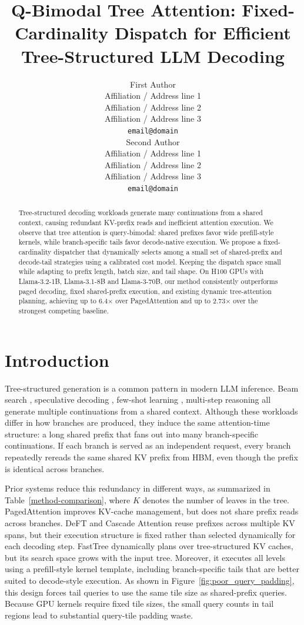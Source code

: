 \documentclass[11pt]{article}
\title{Q-Bimodal Tree Attention: Fixed-Cardinality Dispatch for Efficient Tree-Structured LLM Decoding}
\author{First Author \\
  Affiliation / Address line 1 \\
  Affiliation / Address line 2 \\
  Affiliation / Address line 3 \\
  \texttt{email@domain} \\\And
  Second Author \\
  Affiliation / Address line 1 \\
  Affiliation / Address line 2 \\
  Affiliation / Address line 3 \\
  \texttt{email@domain} \\}
\begin{document}
\maketitle
\begin{abstract}
Tree-structured decoding workloads generate many continuations from a shared context, causing redundant KV-prefix reads and inefficient attention execution. We observe that tree attention is query-bimodal: shared prefixes favor wide prefill-style kernels, while branch-specific tails favor decode-native execution. We propose a fixed-cardinality dispatcher that dynamically selects among a small set of shared-prefix and decode-tail strategies using a calibrated cost model. Keeping the dispatch space small while adapting to prefix length, batch size, and tail shape. On H100 GPUs with Llama-3.2-1B, Llama-3.1-8B and Llama-3-70B, our method consistently outperforms paged decoding, fixed shared-prefix execution, and existing dynamic tree-attention planning, achieving up to 6.4× over PagedAttention and up to 2.73× over the strongest competing baseline.
\end{abstract}

\section{Introduction}

Tree-structured generation is a common pattern in modern LLM inference.
Beam search \cite{vijayakumar2018diversebeamsearchdecoding}, speculative decoding \cite{10.1145/3620666.3651335, li2025eagle3}, few-shot
learning \cite{10.5555/3495724.3495883}, multi-step reasoning \cite{yao2023treethoughtsdeliberateproblem, hao2023reasoninglanguagemodelplanning} all generate multiple continuations from a
shared context. Although these workloads differ in how branches are produced,
they induce the same attention-time structure: a long shared prefix that fans out
into many branch-specific continuations. If each branch is served as an
independent request, every branch repeatedly rereads the same shared KV prefix
from HBM, even though the prefix is identical across branches.

Prior systems reduce this redundancy in different ways, as summarized in
Table~\ref{method-comparison}, where $K$ denotes the number of leaves in the
tree. PagedAttention \cite{10.1145/3600006.3613165} improves KV-cache
management, but does not share prefix reads across branches. DeFT
\cite{yao2025deft} and Cascade Attention \cite{ye2025flashinfer} reuse prefixes
across multiple KV spans, but their execution structure is fixed rather than
selected dynamically for each decoding step. FastTree \cite{pan2025fasttree}
dynamically plans over tree-structured KV caches, but its search space grows
with the input tree. Moreover, it executes all levels using a prefill-style
kernel template, including branch-specific tails that are better suited to
decode-style execution. As shown in Figure~\ref{fig:poor_query_padding}, this
design forces tail queries to use the same tile size as shared-prefix queries.
Because GPU kernels require fixed tile sizes, the small query counts in tail
regions lead to substantial query-tile padding waste.
\end{document}
